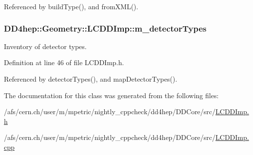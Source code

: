 Referenced by buildType(), and fromXML().\hypertarget{class_d_d4hep_1_1_geometry_1_1_l_c_d_d_imp_ae90ce0f851d3887bb833a42fa34c6aea}{
\subsubsection[{m\_\-detectorTypes}]{ {\bf DD4hep::Geometry::LCDDImp::m\_\-detectorTypes}}}
\label{class_d_d4hep_1_1_geometry_1_1_l_c_d_d_imp_ae90ce0f851d3887bb833a42fa34c6aea}


Inventory of detector types. 

Definition at line 46 of file LCDDImp.h.

Referenced by detectorTypes(), and mapDetectorTypes().

The documentation for this class was generated from the following files:\begin{DoxyCompactItemize}
\item 
/afs/cern.ch/user/m/mpetric/nightly\_\-cppcheck/dd4hep/DDCore/src/\hyperlink{_l_c_d_d_imp_8h}{LCDDImp.h}\item 
/afs/cern.ch/user/m/mpetric/nightly\_\-cppcheck/dd4hep/DDCore/src/\hyperlink{_l_c_d_d_imp_8cpp}{LCDDImp.cpp}\end{DoxyCompactItemize}
